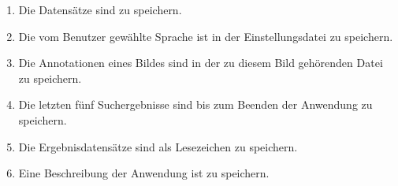 \begin{enumerate} [label=\bfseries /PD \arabic*0/]
	\item Die Datensätze sind zu speichern.
	\item Die vom Benutzer gewählte Sprache ist in der Einstellungsdatei zu speichern.
	\item Die Annotationen eines Bildes sind in der zu diesem Bild gehörenden Datei zu speichern.
	\item Die letzten fünf Suchergebnisse sind bis zum Beenden der Anwendung zu speichern.
	\item Die Ergebnisdatensätze sind als Lesezeichen zu speichern.
	\item Eine Beschreibung der Anwendung ist zu speichern. 

\end{enumerate}
